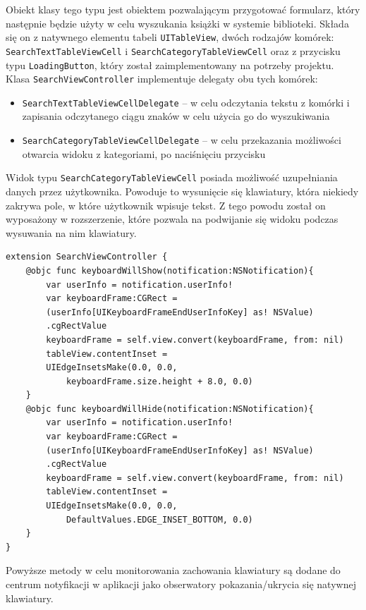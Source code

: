 \documentclass[twoside]{projektInzynierskiMS}
\begin{document}
Obiekt klasy tego typu jest obiektem pozwalającym przygotować formularz, który następnie będzie użyty w celu wyszukania książki w systemie biblioteki. Składa się on z natywnego elementu tabeli \verb`UITableView`, dwóch rodzajów komórek: \verb`SearchTextTableViewCell` i \verb`SearchCategoryTableViewCell` oraz z przycisku typu \verb`LoadingButton`, który został zaimplementowany na potrzeby projektu. Klasa \verb`SearchViewController` implementuje delegaty obu tych komórek:
\begin{itemize}
\item \verb`SearchTextTableViewCellDelegate` -- w celu odczytania tekstu z komórki i zapisania odczytanego ciągu znaków w celu użycia go do wyszukiwania
\item \verb`SearchCategoryTableViewCellDelegate` -- w celu przekazania możliwości otwarcia widoku z kategoriami, po naciśnięciu przycisku 
\end{itemize}

Widok typu \verb`SearchCategoryTableViewCell` posiada możliwość uzupełniania danych przez użytkownika. Powoduje to wysunięcie się klawiatury, która niekiedy zakrywa pole, w które użytkownik wpisuje tekst. Z tego powodu został on wyposażony w rozszerzenie, które pozwala na podwijanie się widoku podczas wysuwania na nim klawiatury.

\begin{verbatim}
extension SearchViewController {
    @objc func keyboardWillShow(notification:NSNotification){
        var userInfo = notification.userInfo!
        var keyboardFrame:CGRect =
        (userInfo[UIKeyboardFrameEndUserInfoKey] as! NSValue)
        .cgRectValue
        keyboardFrame = self.view.convert(keyboardFrame, from: nil)
        tableView.contentInset =
        UIEdgeInsetsMake(0.0, 0.0,
            keyboardFrame.size.height + 8.0, 0.0)
    }
    @objc func keyboardWillHide(notification:NSNotification){
        var userInfo = notification.userInfo!
        var keyboardFrame:CGRect =
        (userInfo[UIKeyboardFrameEndUserInfoKey] as! NSValue)
        .cgRectValue
        keyboardFrame = self.view.convert(keyboardFrame, from: nil)
        tableView.contentInset =
        UIEdgeInsetsMake(0.0, 0.0,
            DefaultValues.EDGE_INSET_BOTTOM, 0.0)
    }
}
\end{verbatim}

Powyższe metody w celu monitorowania zachowania klawiatury są dodane do centrum notyfikacji w aplikacji jako obserwatory pokazania/ukrycia się natywnej klawiatury.
\end{document}
